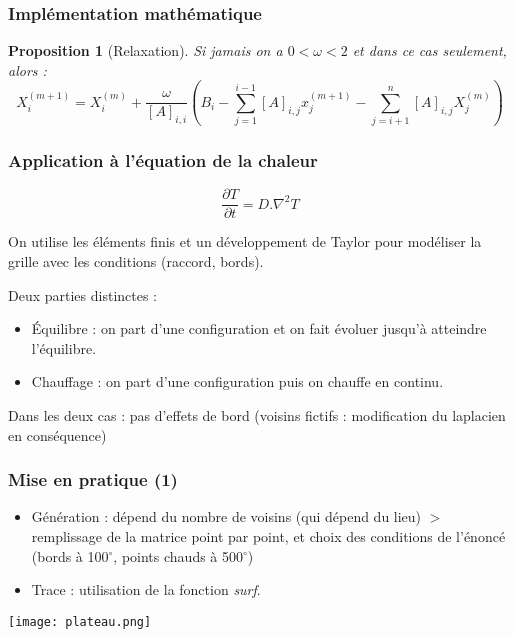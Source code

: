 \documentclass[11pt]{beamer}
\newtheorem{proposition}{Proposition}[section]
\begin{document}
	\begin{frame}
		\frametitle{Implémentation mathématique}
		\begin{proposition}[Relaxation]
			Si jamais on a $0<\omega<2$ et dans ce cas seulement, alors :
			\[X_i^{(m+1)}=X_i^{(m)}+\frac{\omega}{[A]_{i,i}}\left(B_i - \sum_{j=1}^{i-1} [A]_{i,j} x_j^{(m+1)} - \sum_{j=i+1}^{n} [A]_{i,j} X_j^{(m)}\right)\]
		\end{proposition}
	\end{frame}
	\begin{frame}
		\frametitle{Application à l'équation de la chaleur}		
		\[\frac{\partial T}{\partial t}=D.\nabla^2 T\]
		
		On utilise les éléments finis et un développement de Taylor pour modéliser la grille avec les conditions (raccord, bords).
		
		Deux parties distinctes :
		\begin{itemize}
			\item Équilibre : on part d'une configuration et on fait évoluer jusqu'à atteindre l'équilibre.
			\item Chauffage : on part d'une configuration puis on chauffe en continu.
		\end{itemize}
	
		Dans les deux cas : pas d'effets de bord (voisins fictifs : modification du laplacien en conséquence)
	\end{frame}

	\begin{frame}
		\frametitle{Mise en pratique (1)}
		\begin{itemize}
			\item Génération : dépend du nombre de voisins (qui dépend du lieu) $>$ remplissage de la matrice point par point, et choix des conditions de l'énoncé (bords à 100$^\circ$, points chauds à 500$^\circ$)
			\item Trace : utilisation de la fonction \emph{surf}.
		\end{itemize}
		\begin{center}
			\texttt{[image: plateau.png]}
		\end{center}
	\end{frame}
	
\end{document}
